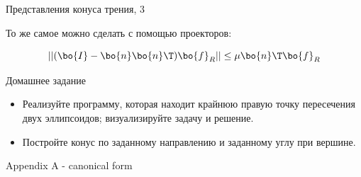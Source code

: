 \documentclass{beamer}
\begin{document}
\begin{frame}{Представления конуса трения, 3}
	\begin{flushleft}
		
		То же самое можно сделать с помощью проекторов:
		
		
		\begin{equation}
			|| (\bo{I} - \bo{n}\bo{n}\T) \bo{f}_R ||
			\leq \mu \bo{n}\T \bo{f}_R
		\end{equation}
		
		
		
	\end{flushleft}
\end{frame}




\begin{frame}{Домашнее задание}
	\begin{flushleft}
		
		\begin{itemize}
			\item Реализуйте программу, которая находит крайнюю правую точку пересечения двух эллипсоидов; визуализируйте задачу и решение.
			
			\item Постройте конус по заданному направлению и заданному углу при вершине.
		\end{itemize}
		
		
		
		
	\end{flushleft}
\end{frame}




\myqrframe



\begin{frame}
	\centerline{\huge Appendix A - canonical form}
\end{frame}
\end{document}
